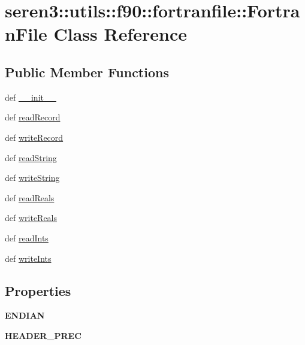\hypertarget{classseren3_1_1utils_1_1f90_1_1fortranfile_1_1FortranFile}{
\section{seren3::utils::f90::fortranfile::FortranFile Class Reference}
\label{classseren3_1_1utils_1_1f90_1_1fortranfile_1_1FortranFile}
}
\subsection*{Public Member Functions}
\begin{DoxyCompactItemize}
\item 
def \hyperlink{classseren3_1_1utils_1_1f90_1_1fortranfile_1_1FortranFile_adbddc016568070013cb3a1a289ced73f}{\_\-\_\-init\_\-\_\-}
\item 
def \hyperlink{classseren3_1_1utils_1_1f90_1_1fortranfile_1_1FortranFile_a7f95a2fb0c7fbc782fde369100e34ff8}{readRecord}
\item 
def \hyperlink{classseren3_1_1utils_1_1f90_1_1fortranfile_1_1FortranFile_a6b02f2bee97855da0d7d712afe50b96a}{writeRecord}
\item 
def \hyperlink{classseren3_1_1utils_1_1f90_1_1fortranfile_1_1FortranFile_a7746939efaf7d5c6029e9078b460bb14}{readString}
\item 
def \hyperlink{classseren3_1_1utils_1_1f90_1_1fortranfile_1_1FortranFile_a195740ec1124270c43d7e832126fb66c}{writeString}
\item 
def \hyperlink{classseren3_1_1utils_1_1f90_1_1fortranfile_1_1FortranFile_a4a59b61f7e55fe4bf4c4912acf0e6123}{readReals}
\item 
def \hyperlink{classseren3_1_1utils_1_1f90_1_1fortranfile_1_1FortranFile_a97118a86f5a056d556e376e349695a59}{writeReals}
\item 
def \hyperlink{classseren3_1_1utils_1_1f90_1_1fortranfile_1_1FortranFile_a3280686a5ad1ca9bda485433d63a547a}{readInts}
\item 
def \hyperlink{classseren3_1_1utils_1_1f90_1_1fortranfile_1_1FortranFile_adc3a94cca262765578a17b9a3ae398f2}{writeInts}
\end{DoxyCompactItemize}
\subsection*{Properties}
\begin{DoxyCompactItemize}
\item 
{\bfseries ENDIAN}
\item 
{\bfseries HEADER\_\-PREC}
\end{DoxyCompactItemize}


